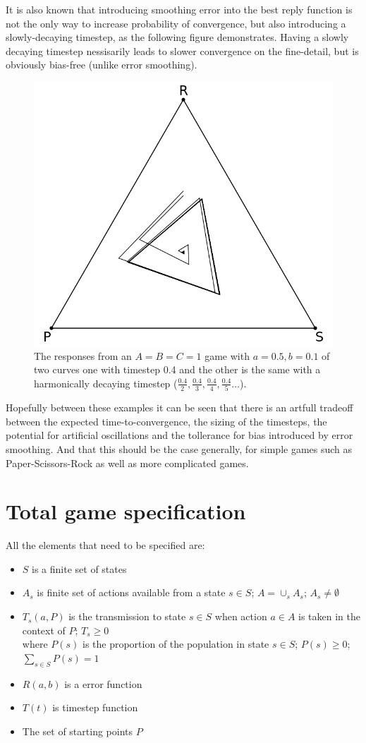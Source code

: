 \documentclass[journal,article,accept,oneauthors,pdftex,10pt,a4paper]{mdpi}
\begin{document}
It is also known that introducing smoothing error into the best reply function is not the only way to increase probability of convergence, but also introducing a slowly-decaying timestep, as the following figure demonstrates.
Having a slowly decaying timestep nessisarily leads to slower convergence on the fine-detail, but is obviously bias-free (unlike error smoothing).

\begin{figure}[ht]
\centering
\includegraphics[width=0.4\linewidth]{orbit4}
\caption{The responses from an $A=B=C=1$ game with $a=0.5,b=0.1$ of two curves one with timestep 0.4 and the other is the same with a harmonically decaying timestep ($ \frac{0.4}{2},\frac{0.4}{3},\frac{0.4}{4},\frac{0.4}{5}\dots $).}
\label{fig:states}
\end{figure}

Hopefully between these examples it can be seen that there is an artfull tradeoff between the expected time-to-convergence, the sizing of the timesteps, the potential for artificial oscillations and the tollerance for bias introduced by error smoothing.
And that this should be the case generally, for simple games such as Paper-Scissors-Rock as well as more complicated games.

\section{Total game specification}

All the elements that need to be specified are:
\begin{itemize}[leftmargin=*,labelsep=4mm]
\item	$S$ is a finite set of states
\item	$A_s$ is finite set of actions available from a state $s\in S$; $A=\cup_s A_s$; $A_s \ne \emptyset$
\item	$T_s(a,P)$ is the transmission to state $s\in S$ when action $a\in A$ is taken in the context of $P$; $T_s\ge 0$\\ where $P(s)$ is the proportion of the population in state $s\in S$; $P(s)\ge 0$; $\sum_{s\in S}P(s)=1$
\item	$R(a,b)$ is a error function
\item	$T(t)$ is timestep function
\item	The set of starting points $P$
\end{itemize}
\end{document}
